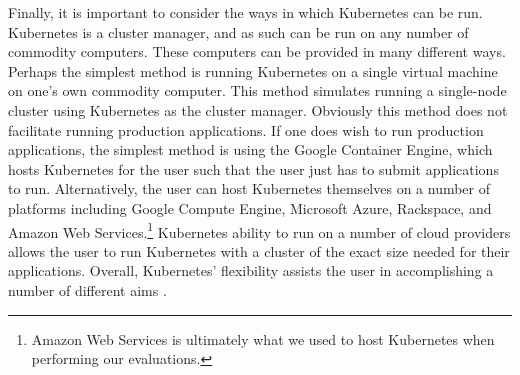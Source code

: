 Finally, it is important to consider the ways in which Kubernetes can be run.
Kubernetes is a cluster manager, and as such can be run on any number of commodity
computers. These computers can be provided in many different ways. Perhaps the
simplest method is running Kubernetes on a single virtual machine on one's own
commodity computer. This method simulates running a single-node cluster using
Kubernetes as the cluster manager. Obviously this method does not facilitate
running production applications. If one does wish to run production
applications, the simplest method is using the Google Container Engine, which
hosts Kubernetes for the user such that the user just has to submit applications to
run. Alternatively, the user can host Kubernetes themselves on a number of
platforms including Google Compute Engine, Microsoft Azure, Rackspace, and
Amazon Web Services.\footnote{Amazon Web Services is ultimately what we used to
host Kubernetes when performing our evaluations.}
Kubernetes ability to run on a number of cloud providers
allows the user to run Kubernetes with a cluster of the exact size needed for
their applications. Overall, Kubernetes' flexibility assists the user in
accomplishing a number of different aims \cite{getting-started-k8s}.
